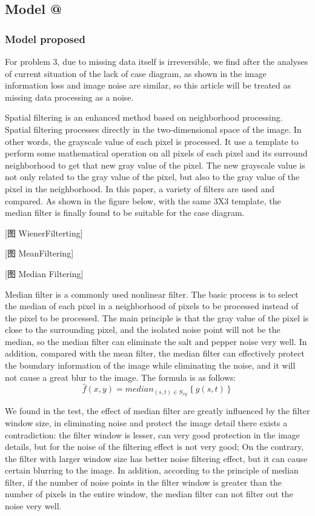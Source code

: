 \documentclass{mcmthesis}
\makeatletter
\newcommand{\Rmnum}[1]{\expandafter\@slowromancap\romannumeral #1@}
\makeatother
\begin{document}
\subsection{Model \Rmnum{2}}
\subsubsection{Model proposed}
For problem 3, due to missing data itself is irreversible, we find after the analyses of current situation of the lack of case diagram, as shown in the image information loss and image noise are similar, so this article will be treated as missing data processing as a noise.

Spatial filtering is an enhanced method based on neighborhood processing. Spatial filtering processes directly in the two-dimensional space of the image. In other words, the grayscale value of each pixel is processed. 
It use a template to perform some mathematical operation on all pixels of each pixel and its surround neighborhood to get that new gray value of the pixel. The new grayscale value is not only related to the gray value of the pixel, but also to the gray value of the pixel in the neighborhood.
In this paper, a variety of filters are used and compared. As shown in the figure below, with the same 3X3 template, the median filter is finally found to be suitable for the case diagram.

[图  WienerFilterting]

    
[图  MeanFiltering]

   
[图  Median Filtering]

Median filter is a commonly used nonlinear filter. The basic process is to select the median of each pixel in a neighborhood of pixels to be processed instead of the pixel to be processed. The main principle is that the gray value of the pixel is close to the surrounding pixel, and the isolated noise point will not be the median, so the median filter can eliminate the salt and pepper noise very well.
In addition, compared with the mean filter, the median filter can effectively protect the boundary information of the image while eliminating the noise, and it will not cause a great blur to the image.
The formula is as follows:
\begin{equation}
  \hat{f}(x,y) = median_{(s,t)\in {S_{xy}}}\left\{g(s,t)\right\}
\end{equation}

We found in the test, the effect of median filter are greatly influenced by the filter window size, in eliminating noise and protect the image detail there exists a contradiction: the filter window is lesser, can very good protection in the image details, but for the noise of the filtering effect is not very good; On the contrary, the filter with larger window size has better noise filtering effect, but it can cause certain blurring to the image.
In addition, according to the principle of median filter, if the number of noise points in the filter window is greater than the number of pixels in the entire window, the median filter can not filter out the noise very well.
\end{document}
